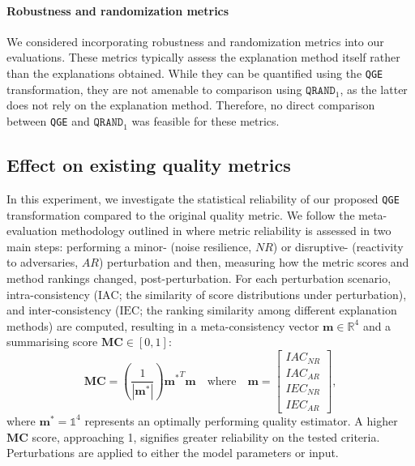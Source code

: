 \paragraph{Robustness and randomization metrics}
We considered incorporating robustness and randomization metrics into our evaluations. These metrics typically assess the explanation method itself rather than the explanations obtained. While they can be quantified using the \texttt{QGE} transformation, they are not amenable to comparison using $\texttt{QRAND}_1$, as the latter does not rely on the explanation method. Therefore, no direct comparison between \texttt{QGE} and $\texttt{QRAND}_1$ was feasible for these metrics.

\subsection{Effect on existing quality metrics}\label{sec:effect_on_metrics}

In this experiment, we investigate the statistical reliability of our proposed \texttt{QGE} transformation compared to the original quality metric. 
We follow the meta-evaluation methodology outlined in \cite{hedstrom2023metaquantus} where metric reliability is assessed in two main steps: performing a minor- (noise resilience, $NR$) or disruptive- (reactivity to adversaries, $AR$) perturbation and then, measuring how the metric scores and method rankings changed, post-perturbation. 
For each perturbation scenario, intra-consistency ($\text{IAC}$; the similarity of score distributions under perturbation), and inter-consistency ($\text{IEC}$; the ranking similarity among different explanation methods) are computed, resulting in a meta-consistency vector $\mathbf{m} \in \mathbb{R}^{4}$ and a summarising score $\mathbf{MC} \in [0, 1]$:
\begin{equation}
    \mathbf{MC} = \left(\frac{1}{|\mathbf{m^{*}}|}\right){\mathbf{m^{*}}}^T\mathbf{m} \quad \text{where} \quad \mathbf{m} = \begin{bmatrix} 
    {IAC}_{NR}\\
    {IAC}_{AR}\\
    {IEC}_{NR}\\ 
    {IEC}_{AR}
    \end{bmatrix},
    \label{eq:meta-eval-vector}
\end{equation}
where $\mathbf{m}^{*} = \mathbb{1}^4$
represents an optimally performing quality estimator. %
A higher $\mathbf{MC}$ score, approaching 1, signifies greater reliability on the tested criteria. Perturbations are applied to either the model parameters or input.

